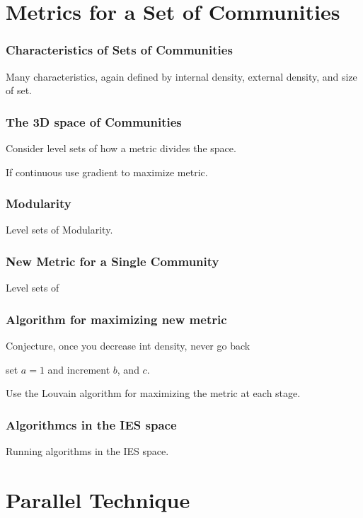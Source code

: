 \documentclass{beamer}
\begin{document}
\section{Metrics for a Set of Communities}

\begin{frame}\frametitle{Characteristics of Sets of Communities}

Many characteristics, again defined by internal density, external density, and size of set.

\end{frame}


\begin{frame}\frametitle{The 3D space of Communities}

Consider level sets of how a metric divides the space.

If continuous use gradient to maximize metric.

\end{frame}



\begin{frame}\frametitle{Modularity}

Level sets of Modularity.

\end{frame}



\begin{frame}\frametitle{New Metric for a Single Community}

Level sets of 

\end{frame}

\begin{frame} \frametitle{Algorithm for maximizing new metric}

Conjecture, once you decrease int density, never go back

set $a=1$ and increment $b$, and $c$.

Use the Louvain algorithm for maximizing the metric at each stage.

\end{frame}

\begin{frame}\frametitle{Algorithmcs in the IES space}

Running algorithms in the IES space.

\end{frame}


\section{Parallel Technique}
\end{document}
